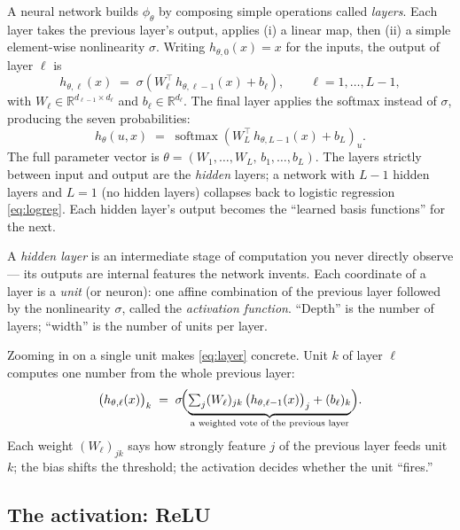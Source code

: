 \documentclass[11pt]{article}
\newcommand{\R}{\mathbb{R}}
\newcommand{\softmax}{\operatorname{softmax}}
\newcommand{\T}{^{\top}}
\begin{document}
A neural network builds $\phi_\theta$ by composing simple operations called \emph{layers}.
Each layer takes the previous layer's output, applies (i) a linear map, then (ii) a simple
element-wise nonlinearity $\sigma$. Writing $h_{\theta,0}(x) = x$ for the inputs, the
output of layer $\ell$ is
\begin{equation}
  h_{\theta,\ell}(x) \;=\; \sigma\!\left(W_\ell\T\, h_{\theta,\ell-1}(x) + b_\ell\right),
  \qquad \ell = 1,\dots,L-1,
  \label{eq:layer}
\end{equation}
with $W_\ell \in \R^{d_{\ell-1}\times d_\ell}$ and $b_\ell \in \R^{d_\ell}$. The final
layer applies the softmax instead of $\sigma$, producing the seven probabilities:
\begin{equation}
  h_\theta(u, x) \;=\; \softmax\!\left(W_L\T\, h_{\theta,L-1}(x) + b_L\right)_u .
  \label{eq:output}
\end{equation}
The full parameter vector is $\theta = (W_1,\dots,W_L,\, b_1,\dots,b_L)$. The layers
strictly between input and output are the \emph{hidden} layers; a network with $L-1$ hidden
layers and $L=1$ (no hidden layers) collapses back to logistic regression
\eqref{eq:logreg}. Each hidden layer's output becomes the ``learned basis functions'' for
the next.

\begin{jargon}
A \emph{hidden layer} is an intermediate stage of computation you never directly observe
--- its outputs are internal features the network invents. Each coordinate of a layer is a
\emph{unit} (or neuron): one affine combination of the previous layer followed by the
nonlinearity $\sigma$, called the \emph{activation function}. ``Depth'' is the number of
layers; ``width'' is the number of units per layer.
\end{jargon}

Zooming in on a single unit makes \eqref{eq:layer} concrete. Unit $k$ of layer $\ell$
computes one number from the whole previous layer:
\begin{equation}
  \bigl(h_{\theta,\ell}(x)\bigr)_k
  \;=\; \sigma\!\Bigl(\underbrace{\textstyle\sum_{j} (W_\ell)_{jk}\,\bigl(h_{\theta,\ell-1}(x)\bigr)_j + (b_\ell)_k}_{\text{a weighted vote of the previous layer}}\Bigr).
  \label{eq:unit}
\end{equation}
Each weight $(W_\ell)_{jk}$ says how strongly feature $j$ of the previous layer feeds unit
$k$; the bias shifts the threshold; the activation decides whether the unit ``fires.''

\subsection{The activation: ReLU}
\end{document}
